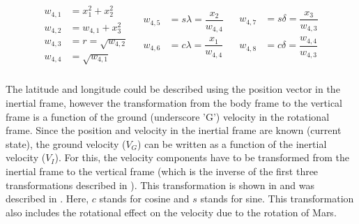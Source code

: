 \begin{align} \label{eq:auxFtransAngl}
\begin{split}
w_{4,1} &= x_{1}^{2}+x_{2}^{2} \\
w_{4,2} &= w_{4,1}+x_{3}^{2} \\
w_{4,3} &= r = \sqrt{w_{4,2}} \\
w_{4,4} &= \sqrt{w_{4,1}} \\
\end{split}
&
\begin{split}
w_{4,5} &= s\lambda = \dfrac{x_{2}}{w_{4,4}}\\
w_{4,6} &= c\lambda = \dfrac{x_{1}}{w_{4,4}} \\
\end{split}
&
\begin{split}
w_{4,7} &= s\delta = \dfrac{x_{3}}{w_{4,3}} \\
w_{4,8} &= c\delta = \dfrac{w_{4,4}}{w_{4,3}}\\
\end{split} 
\end{align} 


The latitude and longitude could be described using the position vector in the inertial frame, however the transformation from the body frame to the vertical frame is a function of the ground (underscore 'G') velocity in the rotational frame. Since the position and velocity in the inertial frame are known (current state), the ground velocity ($V_{G}$) can be written as a function of the inertial velocity ($V_{I}$). For this, the velocity components have to be transformed from the inertial frame to the vertical frame (which is the inverse of the first three transformations described in ). This transformation is shown in  and was described in \cite{mooij1994motion}. Here, $c$ stands for cosine and $s$ stands for sine. This transformation also includes the rotational effect on the velocity due to the rotation of Mars.
 
